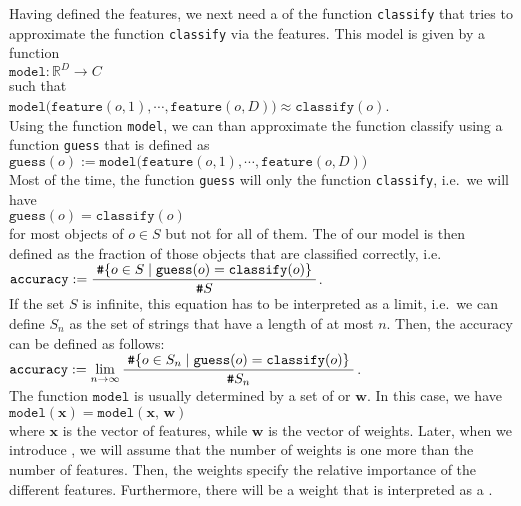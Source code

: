 Having defined the features, we next need a  of the function \texttt{classify} that tries to approximate the
function \texttt{classify} via the features.  This model is given by a function
\\[0.2cm]
\hspace*{1.3cm}
$\mathtt{model}: \mathbb{R}^D \rightarrow C$
\\[0.2cm]
such that
\\[0.2cm]
\hspace*{1.3cm}
$\mathtt{model}\bigl(\mathtt{feature}(o,1), \cdots, \mathtt{feature}(o,D)\bigr) \approx \mathtt{classify}(o)$.
\\[0.2cm]
Using the function \texttt{model}, we can than approximate the function classify using a function \texttt{guess} that is
defined as
\\[0.2cm]
\hspace*{1.3cm}
$\mathtt{guess}(o) := \mathtt{model}\bigl(\mathtt{feature}(o,1), \cdots, \mathtt{feature}(o,D)\bigr)$
\\[0.2cm]
Most of the time, the function \texttt{guess} will only  the function \texttt{classify}, i.e.~we will have
\\[0.2cm]
\hspace*{1.3cm}
$\mathtt{guess}(o) = \mathtt{classify}(o)$
\\[0.2cm]
for most objects of $o \in S$ but not for all of them.  The  of our model is then defined as the fraction
of those objects that are classified correctly, i.e.~
\\[0.2cm]
\hspace*{1.3cm}
$\displaystyle \mathtt{accuracy} := \frac{\;\texttt{\#} \{ o \in S \mid \mathtt{guess}(o) = \mathtt{classify}(o)\}\;}{\texttt{\#} S}$.
\\[0.2cm]
If the set $S$ is infinite, this equation has to be interpreted as a limit, i.e.~we can define
$S_n$ as the set of strings that have a length of at most $n$.  Then, the accuracy can be defined as follows:
\\[0.2cm]
\hspace*{1.3cm}
$\displaystyle \mathtt{accuracy} := \lim\limits_{n\rightarrow\infty}\frac{\;\texttt{\#} \{ o \in S_n \mid \mathtt{guess}(o) = \mathtt{classify}(o)\}\;}{\texttt{\#} S_n}$.
\\[0.2cm]
The function $\mathtt{model}$ is usually determined by a set of  or  $\mathbf{w}$. In
this case, we have
\\[0.2cm]
\hspace*{1.3cm}
$\mathtt{model}(\mathbf{x}) = \mathtt{model}(\mathbf{x},\,\mathbf{w})$
\\[0.2cm]
where $\mathbf{x}$ is the vector of features, while $\mathbf{w}$ is the vector of weights.  Later, when we
introduce , we will assume that the number of weights is one more than the number of
features.  Then, the weights specify the relative importance of the different features. Furthermore, there will
be a weight that is interpreted as a .

